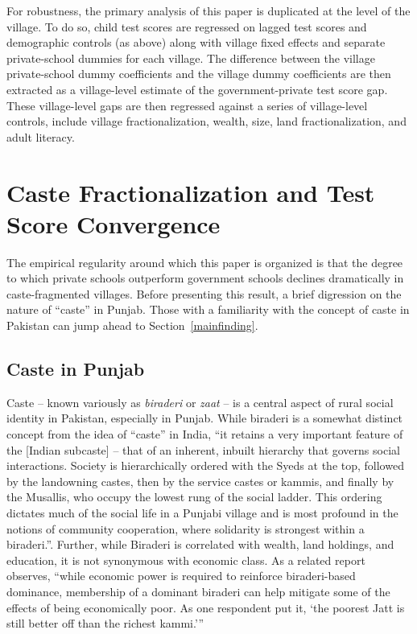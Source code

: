 \documentclass[12pt]{article}
\begin{document}
For robustness, the primary analysis of this paper is duplicated at the level of the village. To do so, child test scores are regressed on lagged test scores and demographic controls (as above) along with village fixed effects and separate private-school dummies for each village. The difference between the village private-school dummy coefficients and the village dummy coefficients are then extracted as a village-level estimate of the government-private test score gap. These village-level gaps are then regressed against a series of village-level controls, include village fractionalization, wealth, size, land fractionalization, and adult literacy. 




\section{Caste Fractionalization and Test Score Convergence}\label{caste} %

The empirical regularity around which this paper is organized is that the degree to which private schools outperform government schools declines dramatically in caste-fragmented villages. Before presenting this result, a brief digression on the nature of ``caste'' in Punjab. Those with a familiarity with the concept of caste in Pakistan can jump ahead to Section~\ref{mainfinding}. 

\subsection{Caste in Punjab}\label{}

Caste -- known variously as \emph{biraderi} or \emph{zaat} -- is a central aspect of rural social identity in Pakistan, especially in Punjab. While biraderi is a somewhat distinct concept from the idea of ``caste'' in India, ``it retains a very important feature of the [Indian subcaste] -- that of an inherent, inbuilt hierarchy that governs social interactions. Society is hierarchically ordered with the Syeds at the top, followed by the landowning castes, then by the service castes or kammis, and finally by the Musallis, who occupy the lowest rung of the social ladder. This ordering dictates much of the social life in a Punjabi village and is most profound in the notions of community cooperation, where solidarity is strongest within a biraderi.''\citep[p. 29]{Gazdar:2007vt}. Further, while Biraderi is correlated with wealth, land holdings, and education, it is not synonymous with economic class. As a related report observes, ``while economic power is required to reinforce biraderi-based dominance, membership of a dominant biraderi can help mitigate some of the effects of being economically poor. As one respondent put it, `the poorest Jatt is still better off than the richest kammi.''' \citep[p. 13]{Gazdar:2007vt} 
\end{document}
